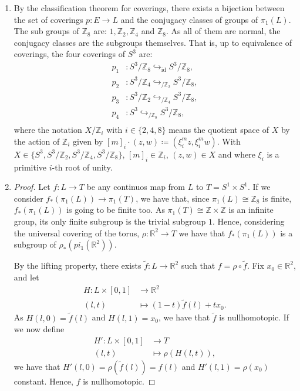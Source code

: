 \documentclass[11pt,a4paper]{article}
\newcommand{\id}{\operatorname{id}}
\newcommand{\R}{\mathbb R}
\newcommand{\Z}{\mathbb Z}
\begin{document}
\begin{enumerate}[label=\alph*)]
    \item By the classification theorem for coverings, there exists a bijection between the set of coverings $p\colon E \to L $ and the conjugacy classes of groups of $ \pi_1(L)$. The sub groups of $ \Z_8 $ are: $1, \Z_2, \Z_4 $ and $ \Z_8$. As all of them are normal, the conjugacy classes are the subgroups themselves. That is, up to equivalence of coverings, the four coverings of $ S^3 $ are:
    \begin{align*}
      p_1 &\colon S^3 / \Z_8 \hookrightarrow_{\id} S^3 / \Z_8, \\
      p_2 &\colon S^3 / \Z_4 \hookrightarrow_{/ \Z_2} S^3 / \Z_8, \\
      p_3 &\colon S^3 / \Z_2 \hookrightarrow_{/ \Z_4} S^3 / \Z_8, \\
      p_4 &\colon S^3 \hookrightarrow_{/ \Z_8} S^3 / \Z_8, \\
    \end{align*}
    where the notation $ X/\Z_i $ with $ i \in \{ 2, 4, 8\} $ means the quotient space of $ X $ by the action of $ \Z_i $ given by $ [m]_i \cdot (z, w) \coloneq (\xi_i^m z, \xi_i^m w) $. With $ X \in \{ S^3, S^3 / \Z_2, S^3 / \Z_4, S^3 / \Z_8\}$, $[m]_i \in \Z_i $, $ (z, w) \in X $ and where $ \xi_i $ is a primitive $i$-th root of unity.

    \item \begin{proof} Let $ f \colon L \to T $ be any continuos map from $ L $ to $ T = S^1 \times S^1 $. If we consider $ f_*(\pi_1(L)) \to \pi_1(T) $, we have that, since $ \pi_1(L) \cong \Z_8 $ is finite, $ f_*(\pi_1(L)) $ is going to be finite too. As $ \pi_1(T) \cong \Z \times \Z $ is an infinite group, its only finite subgroup is the trivial subgroup $ {1} $. Hence, considering the universal covering of 
    the torus, $ \rho \colon \R^2 \to T $ we have that $ f_*(\pi_1(L)) $ is a subgroup of $ \rho_*(pi_1(\R^2)) $.
    
    By the lifting property, there exists $ \tilde f \colon L \to \R^2 $ such that $ f = \rho \circ \tilde f $. Fix $ x_0 \in \R^2 $, and let
    \begin{align*}
      H\colon L \times [0,1] &\to \R^2 \\
      (l, t) &\mapsto (1-t) \tilde f(l) + tx_0.
    \end{align*}
    As $ H(l, 0) = \tilde f(l) $ and $ H(l, 1) = x_0 $, we have that $ \tilde f $ is nullhomotopic. If we now define
    \begin{align*}
      H'\colon L \times [0,1] &\to T \\
      (l, t) &\mapsto \rho(H(l,t)),
    \end{align*}
    we have that $H'(l, 0) = \rho(\tilde f(l)) = f(l) $ and $H'(l, 1) = \rho(x_0) $ constant. Hence, $ f $ is nullhomotopic.
  \end{proof}
  \end{enumerate}
\end{document}
